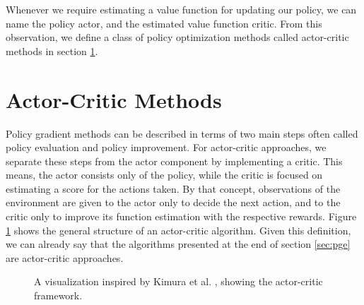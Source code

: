 \documentclass[final]{IEEEtran}
\begin{document}
Whenever we require estimating a value function for updating our policy, we can name the policy actor, and the estimated value function critic. 
From this observation, we define a class of policy optimization methods called actor-critic methods in section \ref{sec:ac}.


\section{Actor-Critic Methods} 
\label{sec:ac}

Policy gradient methods can be described in terms of two main steps often called policy evaluation and policy improvement. 
For actor-critic approaches, we separate these steps from the actor component by implementing a critic. 
This means, the actor consists only of the policy, while the critic is focused on estimating a score for the actions taken. 
By that concept, observations of the environment are given to the actor only to decide the next action, and to the critic only to improve its function estimation with the respective rewards. 
Figure \ref{fig:ac} shows the general structure of an actor-critic algorithm.
Given this definition, we can already say that the algorithms presented at the end of section \ref{sec:pge} are actor-critic approaches.

\begin{figure}
  \begin{center}
  \end{center}
  \caption{A visualization inspired by Kimura et al. \cite{Kimura1998AnAO}, showing the actor-critic framework.} \label{fig:ac}
\end{figure}
\end{document}
